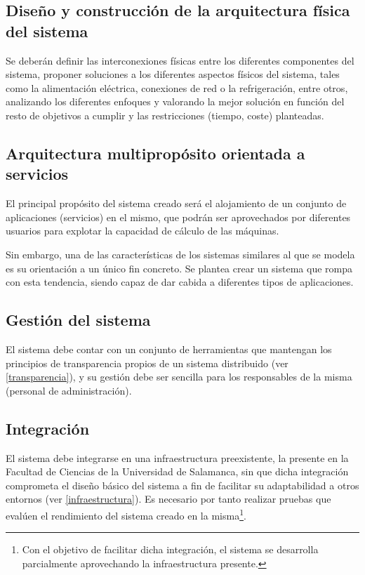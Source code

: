 \subsection{Diseño y construcción de la arquitectura física del sistema}

Se deberán definir las interconexiones físicas entre los diferentes componentes del sistema, proponer soluciones a los diferentes aspectos físicos del sistema, tales como la alimentación eléctrica, conexiones de red o la refrigeración, entre otros, analizando los diferentes enfoques y valorando la mejor solución en función del resto de objetivos a cumplir y las restricciones (tiempo, coste) planteadas.

\subsection{Arquitectura multipropósito orientada a servicios}

El principal propósito del sistema creado será el alojamiento de un conjunto de aplicaciones (servicios) en el mismo, que podrán ser aprovechados por diferentes usuarios para explotar la capacidad de cálculo de las máquinas.

Sin embargo, una de las características de los sistemas similares al que se modela es su orientación a un único fin concreto. Se plantea crear un sistema que rompa con esta tendencia, siendo capaz de dar cabida a diferentes tipos de aplicaciones.

\subsection{Gestión del sistema}

El sistema debe contar con un conjunto de herramientas que mantengan los principios de transparencia propios de un sistema distribuido (ver \ref{transparencia}), y su gestión debe ser sencilla para los responsables de la misma (personal de administración).

\subsection{Integración}

El sistema debe integrarse en una infraestructura preexistente, la presente en la Facultad de Ciencias de la Universidad de Salamanca, sin que dicha integración comprometa el diseño básico del sistema a fin de facilitar su adaptabilidad a otros entornos (ver \ref{infraestructura}). Es necesario por tanto realizar pruebas que evalúen el rendimiento del sistema creado en la misma\footnote {Con el objetivo de facilitar dicha integración, el sistema se desarrolla parcialmente aprovechando la infraestructura presente.}.


